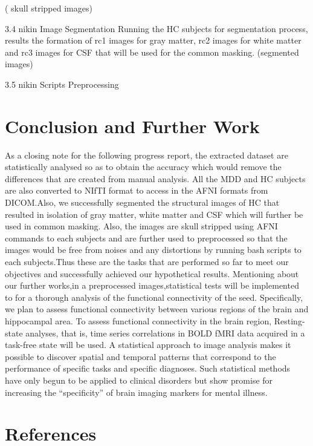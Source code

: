 \documentclass[12pt]{article}
\begin{document}
( skull stripped images)

3.4 nikin Image Segmentation Running the HC subjects for segmentation
process, results the formation of rc1 images for gray matter, rc2
images for white matter and rc3 images for CSF that will be used for
the common masking. (segmented images)

3.5 nikin Scripts Preprocessing

\section{Conclusion and Further Work}

As a closing note for the following progress report, the extracted
dataset are statistically analysed so as to obtain the accuracy which
would remove the differences that are created from manual analysis.
All the MDD and HC subjects are also converted to NIfTI format to
access in the AFNI formats from DICOM.Also, we successfully segmented
the structural images of HC that resulted in isolation of gray matter,
white matter and CSF which will further be used in common masking.
Also, the images are skull stripped using AFNI commands to each
subjects and are further used to preprocessed so that the images would
be free from noises and any distortions by running bash scripts to
each subjects.Thus these are the tasks that are performed so far to
meet our objectives and successfully achieved our hypothetical
results. Mentioning about our further works,in a preprocessed
images,statistical tests will be implemented to for a thorough
analysis of the functional connectivity of the seed. Specifically, we
plan to assess functional connectivity between various regions of the
brain and hippocampal area. To assess functional connectivity in the
brain region, Resting-state analyses, that is, time series
correlations in BOLD fMRI data acquired in a task-free state will be
used. A statistical approach to image analysis makes it possible to
discover spatial and temporal patterns that correspond to the
performance of specific tasks and specific diagnoses. Such statistical
methods have only begun to be applied to clinical disorders but show
promise for increasing the ``specificity'' of brain imaging markers
for mental illness.

\newpage
\section*{References}
\printbibliography[heading=none]
\end{document}
